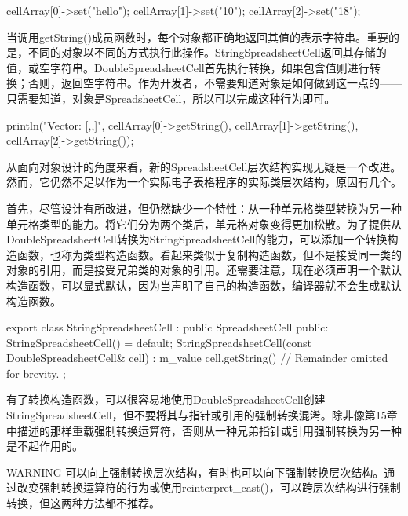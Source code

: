 \begin{cpp}
cellArray[0]->set("hello");
cellArray[1]->set("10");
cellArray[2]->set("18");
\end{cpp}

当调用getString()成员函数时，每个对象都正确地返回其值的表示字符串。重要的是，不同的对象以不同的方式执行此操作。StringSpreadsheetCell返回其存储的值，或空字符串。DoubleSpreadsheetCell首先执行转换，如果包含值则进行转换；否则，返回空字符串。作为开发者，不需要知道对象是如何做到这一点的——只需要知道，对象是SpreadsheetCell，所以可以完成这种行为即可。

\begin{cpp}
println("Vector: [{},{},{}]", cellArray[0]->getString(),
                              cellArray[1]->getString(),
                              cellArray[2]->getString());
\end{cpp}



从面向对象设计的角度来看，新的SpreadsheetCell层次结构实现无疑是一个改进。然而，它仍然不足以作为一个实际电子表格程序的实际类层次结构，原因有几个。

首先，尽管设计有所改进，但仍然缺少一个特性：从一种单元格类型转换为另一种单元格类型的能力。将它们分为两个类后，单元格对象变得更加松散。为了提供从DoubleSpreadsheetCell转换为StringSpreadsheetCell的能力，可以添加一个转换构造函数，也称为类型构造函数。看起来类似于复制构造函数，但不是接受同一类的对象的引用，而是接受兄弟类的对象的引用。还需要注意，现在必须声明一个默认构造函数，可以显式默认，因为当声明了自己的构造函数，编译器就不会生成默认构造函数。

\begin{cpp}
export class StringSpreadsheetCell : public SpreadsheetCell
{
    public:
        StringSpreadsheetCell() = default;
        StringSpreadsheetCell(const DoubleSpreadsheetCell& cell)
            : m_value { cell.getString() }
        { }
        // Remainder omitted for brevity.
};
\end{cpp}

有了转换构造函数，可以很容易地使用DoubleSpreadsheetCell创建StringSpreadsheetCell，但不要将其与指针或引用的强制转换混淆。除非像第15章中描述的那样重载强制转换运算符，否则从一种兄弟指针或引用强制转换为另一种是不起作用的。

\begin{myWarning}{WARNING}
可以向上强制转换层次结构，有时也可以向下强制转换层次结构。通过改变强制转换运算符的行为或使用reinterpret\_cast()，可以跨层次结构进行强制转换，但这两种方法都不推荐。
\end{myWarning}

